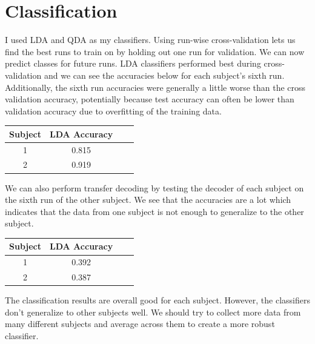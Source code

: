 \documentclass[12pt]{article}
\begin{document}
\section{Classification}
I used LDA and QDA as my classifiers. Using run-wise cross-validation lets us find the best runs to train on by holding out one run for validation. We can now predict classes for future runs. LDA classifiers performed best during cross-validation and we can see the accuracies below for each subject's sixth run. Additionally, the sixth run accuracies were generally a little worse than the cross validation accuracy, potentially because test accuracy can often be lower than validation accuracy due to overfitting of the training data.

\begin{center}
    \begin{tabular}{c c c c}
        \toprule
        Subject & LDA Accuracy \\ \midrule
        1 & 0.815 \\
        2 & 0.919 \\ \bottomrule
    \end{tabular}
\end{center}

We can also perform transfer decoding by testing the decoder of each subject on the sixth run of the other subject. We see that the accuracies are a lot which indicates that the data from one subject is not enough to generalize to the other subject.

\begin{center}
    \begin{tabular}{c c c c}
        \toprule
        Subject & LDA Accuracy \\ \midrule
        1 & 0.392 \\
        2 & 0.387 \\ \bottomrule
    \end{tabular}
\end{center}

The classification results are overall good for each subject. However, the classifiers don't generalize to other subjects well. We should try to collect more data from many different subjects and average across them to create a more robust classifier.
\end{document}
